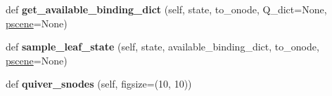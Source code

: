 \begin{DoxyCompactItemize}
def {\bfseries get\+\_\+available\+\_\+binding\+\_\+dict} (self, state, to\+\_\+onode, Q\+\_\+dict=None, \hyperlink{classrnb-planning_1_1src_1_1pkg_1_1planning_1_1task_1_1interface_1_1_task_interface_aa7ffb430242b8cf040b951cf2828d598}{pscene}=None)
\item 
\mbox{\label{classrnb-planning_1_1src_1_1pkg_1_1planning_1_1task_1_1object__a__star_1_1_object_astar_ad646db1a0056a5b506e5ed64ef32b9d2}} 
def {\bfseries sample\+\_\+leaf\+\_\+state} (self, state, available\+\_\+binding\+\_\+dict, to\+\_\+onode, \hyperlink{classrnb-planning_1_1src_1_1pkg_1_1planning_1_1task_1_1interface_1_1_task_interface_aa7ffb430242b8cf040b951cf2828d598}{pscene}=None)
\item 
\mbox{\label{classrnb-planning_1_1src_1_1pkg_1_1planning_1_1task_1_1object__a__star_1_1_object_astar_a5a72221c34346026234ae52081367731}} 
def {\bfseries quiver\+\_\+snodes} (self, figsize=(10, 10))
\end{DoxyCompactItemize}
